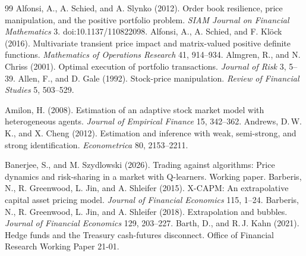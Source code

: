 \documentclass[12pt]{article}
\theoremstyle{definition}
\theoremstyle{remark}
\begin{document}
\begin{thebibliography}{99}\setlength{\itemsep}{2pt}\small
{} Alfonsi, A., A. Schied, and A. Slynko (2012). Order book resilience, price manipulation, and the positive portfolio problem. \emph{SIAM Journal on Financial Mathematics} 3. doi:10.1137/110822098.
 Alfonsi, A., A. Schied, and F. Kl\"ock (2016). Multivariate transient price impact and matrix-valued positive definite functions. \emph{Mathematics of Operations Research} 41, 914--934.
 Almgren, R., and N. Chriss (2001). Optimal execution of portfolio transactions. \emph{Journal of Risk} 3, 5--39.
 Allen, F., and D. Gale (1992). Stock-price manipulation. \emph{Review of Financial Studies} 5, 503--529.

 Amilon, H. (2008). Estimation of an adaptive stock market model with heterogeneous agents. \emph{Journal of Empirical Finance} 15, 342--362.
 Andrews, D.\,W.\,K., and X. Cheng (2012). Estimation and inference with weak, semi-strong, and strong identification. \emph{Econometrica} 80, 2153--2211.

 Banerjee, S., and M. Szydlowski (2026). Trading against algorithms: Price dynamics and risk-sharing in a market with Q-learners. Working paper.
 Barberis, N., R. Greenwood, L. Jin, and A. Shleifer (2015). X-CAPM: An extrapolative capital asset pricing model. \emph{Journal of Financial Economics} 115, 1--24.
 Barberis, N., R. Greenwood, L. Jin, and A. Shleifer (2018). Extrapolation and bubbles. \emph{Journal of Financial Economics} 129, 203--227.
 Barth, D., and R.\,J. Kahn (2021). Hedge funds and the Treasury cash-futures disconnect. Office of Financial Research Working Paper 21-01.


\end{thebibliography}
\end{document}
